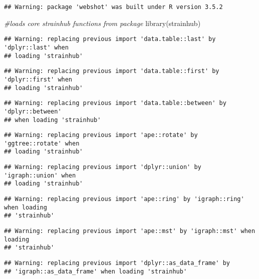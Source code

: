 \documentclass[
]{article}
\newenvironment{Shaded}{\begin{snugshade}}{\end{snugshade}}
\newcommand{\CommentTok}[1]{\textcolor[rgb]{0.56,0.35,0.01}{\textit{#1}}}
\newcommand{\FunctionTok}[1]{\textcolor[rgb]{0.00,0.00,0.00}{#1}}
\newcommand{\NormalTok}[1]{#1}
\begin{document}
\begin{verbatim}
## Warning: package 'webshot' was built under R version 3.5.2
\end{verbatim}

\begin{Shaded}
\begin{Highlighting}[]
\CommentTok{\#loads core strainhub functions from package}
\FunctionTok{library}\NormalTok{(strainhub)}
\end{Highlighting}
\end{Shaded}

\begin{verbatim}
## Warning: replacing previous import 'data.table::last' by 'dplyr::last' when
## loading 'strainhub'
\end{verbatim}

\begin{verbatim}
## Warning: replacing previous import 'data.table::first' by 'dplyr::first' when
## loading 'strainhub'
\end{verbatim}

\begin{verbatim}
## Warning: replacing previous import 'data.table::between' by 'dplyr::between'
## when loading 'strainhub'
\end{verbatim}

\begin{verbatim}
## Warning: replacing previous import 'ape::rotate' by 'ggtree::rotate' when
## loading 'strainhub'
\end{verbatim}

\begin{verbatim}
## Warning: replacing previous import 'dplyr::union' by 'igraph::union' when
## loading 'strainhub'
\end{verbatim}

\begin{verbatim}
## Warning: replacing previous import 'ape::ring' by 'igraph::ring' when loading
## 'strainhub'
\end{verbatim}

\begin{verbatim}
## Warning: replacing previous import 'ape::mst' by 'igraph::mst' when loading
## 'strainhub'
\end{verbatim}

\begin{verbatim}
## Warning: replacing previous import 'dplyr::as_data_frame' by
## 'igraph::as_data_frame' when loading 'strainhub'
\end{verbatim}
\end{document}
